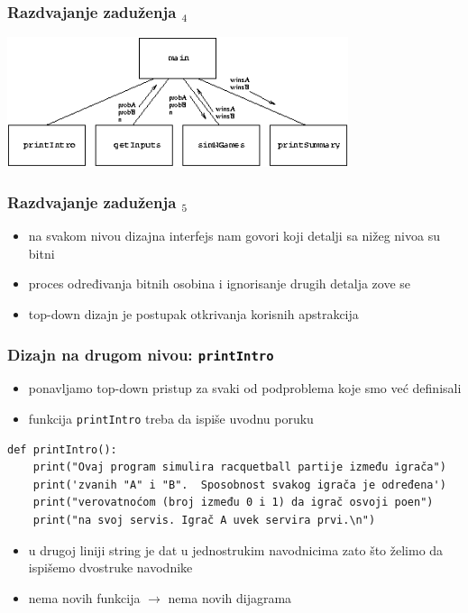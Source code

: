 \documentclass[utf8,compress,aspectratio=169]{beamer}
\begin{document}
\begin{frame}
  \frametitle{Razdvajanje zaduženja $_4$}
  \begin{center}
    \includegraphics[width=10cm]{pic22}
  \end{center}
\end{frame}

\begin{frame}
  \frametitle{Razdvajanje zaduženja $_5$}
  \begin{itemize}
    \item na svakom nivou dizajna interfejs nam govori koji detalji sa nižeg nivoa su bitni
    \item proces određivanja bitnih osobina i ignorisanje drugih detalja zove se 
    \item top-down dizajn je postupak otkrivanja korisnih apstrakcija
  \end{itemize}
\end{frame}

\begin{frame}[fragile,shrink=15]
  \frametitle{Dizajn na drugom nivou: \texttt{printIntro}}
  \begin{itemize}
    \item ponavljamo top-down pristup za svaki od podproblema koje smo već definisali
    \item funkcija \texttt{printIntro} treba da ispiše uvodnu poruku
  \end{itemize}
\begin{verbatim}
def printIntro():
    print("Ovaj program simulira racquetball partije između igrača")
    print('zvanih "A" i "B".  Sposobnost svakog igrača je određena')
    print("verovatnoćom (broj između 0 i 1) da igrač osvoji poen")
    print("na svoj servis. Igrač A uvek servira prvi.\n")
\end{verbatim}
  \begin{itemize}
    \item u drugoj liniji string je dat u jednostrukim navodnicima zato što želimo da ispišemo dvostruke navodnike
    \item nema novih funkcija $\rightarrow$ nema novih dijagrama
  \end{itemize}
\end{frame}
\end{document}
